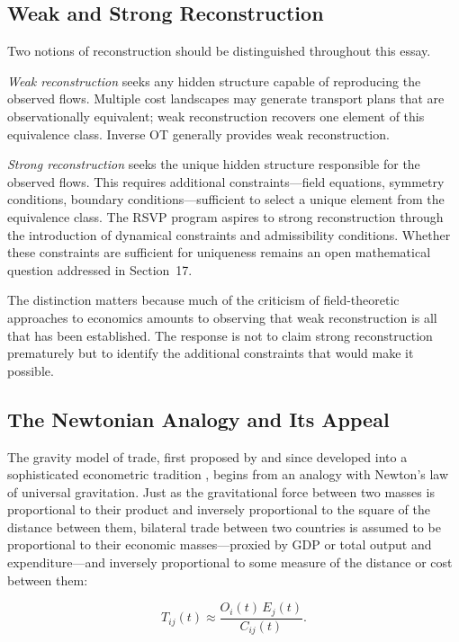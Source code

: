 \documentclass[12pt]{article}
\begin{document}
\subsection{Weak and Strong Reconstruction}

Two notions of reconstruction should be distinguished throughout this essay.

\emph{Weak reconstruction} seeks any hidden structure capable of reproducing the observed flows. Multiple cost landscapes may generate transport plans that are observationally equivalent; weak reconstruction recovers one element of this equivalence class. Inverse OT generally provides weak reconstruction.

\emph{Strong reconstruction} seeks the unique hidden structure responsible for the observed flows. This requires additional constraints---field equations, symmetry conditions, boundary conditions---sufficient to select a unique element from the equivalence class. The RSVP program aspires to strong reconstruction through the introduction of dynamical constraints and admissibility conditions. Whether these constraints are sufficient for uniqueness remains an open mathematical question addressed in Section~17.

The distinction matters because much of the criticism of field-theoretic approaches to economics amounts to observing that weak reconstruction is all that has been established. The response is not to claim strong reconstruction prematurely but to identify the additional constraints that would make it possible.

\subsection{The Newtonian Analogy and Its Appeal}

The gravity model of trade, first proposed by \citet{tinbergen1962} and since developed into a sophisticated econometric tradition \citep{anderson2003, galichon2016, yotov2022}, begins from an analogy with Newton's law of universal gravitation. Just as the gravitational force between two masses is proportional to their product and inversely proportional to the square of the distance between them, bilateral trade between two countries is assumed to be proportional to their economic masses---proxied by GDP or total output and expenditure---and inversely proportional to some measure of the distance or cost between them:

\begin{equation}
T_{ij}(t) \approx \frac{O_i(t)\, E_j(t)}{C_{ij}(t)}.
\label{eq:gravity_basic}
\end{equation}
\end{document}
